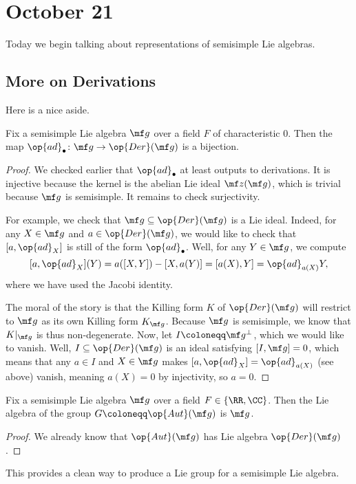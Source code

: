 \documentclass[../notes.tex]{subfiles}
\begin{document}
\section{October 21}
Today we begin talking about representations of semisimple Lie algebras.

\subsection{More on Derivations}
Here is a nice aside.
\begin{proposition} \label{prop:ss-derivations-are-inner}
	Fix a semisimple Lie algebra $\mf g$ over a field $F$ of characteristic $0$. Then the map $\op{ad}_\bullet\colon\mf g\to\op{Der}(\mf g)$ is a bijection.
\end{proposition}
\begin{proof}
	We checked earlier that $\op{ad}_\bullet$ at least outputs to derivations. It is injective because the kernel is the abelian Lie ideal $\mf z(\mf g)$, which is trivial because $\mf g$ is semisimple. It remains to check surjectivity.

	For example, we check that $\mf g\subseteq\op{Der}(\mf g)$ is a Lie ideal. Indeed, for any $X\in\mf g$ and $a\in\op{Der}(\mf g)$, we would like to check that $[a,{\op{ad}_X}]$ is still of the form $\op{ad}_\bullet$. Well, for any $Y\in\mf g$, we compute
	\[[a,{\op{ad}_X}](Y)=a([X,Y])-[X,a(Y)]=[a(X),Y]=\op{ad}_{a(X)}Y,\]
	where we have used the Jacobi identity.

	The moral of the story is that the Killing form $K$ of $\op{Der}(\mf g)$ will restrict to $\mf g$ as its own Killing form $K_{\mf g}$. Because $\mf g$ is semisimple, we know that $K|_{\mf g}$ is thus non-degenerate. Now, let $I\coloneqq\mf g^{\perp}$, which we would like to vanish. Well, $I\subseteq\op{Der}(\mf g)$ is an ideal satisfying $[I,\mf g]=0$, which means that any $a\in I$ and $X\in\mf g$ makes $[a,{\op{ad}_X}]=\op{ad}_{a(X)}$ (see above) vanish, meaning $a(X)=0$ by injectivity, so $a=0$.
\end{proof}
\begin{corollary}
	Fix a semisimple Lie algebra $\mf g$ over a field $F\in\{\RR,\CC\}$. Then the Lie algebra of the group $G\coloneqq\op{Aut}(\mf g)$ is $\mf g$.
\end{corollary}
\begin{proof}
	We already know that $\op{Aut}(\mf g)$ has Lie algebra $\op{Der}(\mf g)$.
\end{proof}
This provides a clean way to produce a Lie group for a semisimple Lie algebra.
\end{document}
